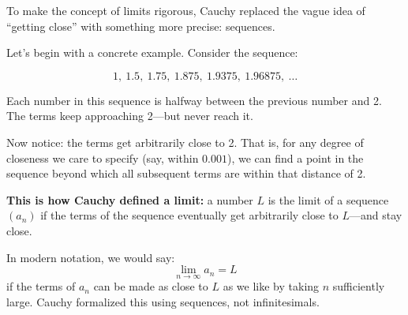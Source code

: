 To make the concept of limits rigorous, Cauchy replaced the vague idea of “getting close” with something more precise: sequences.

Let’s begin with a concrete example. Consider the sequence:

\[
1,\ 1.5,\ 1.75,\ 1.875,\ 1.9375,\ 1.96875,\ \dots
\]

Each number in this sequence is halfway between the previous number and 2. The terms keep approaching 2—but never reach it.

Now notice: the terms get arbitrarily close to 2. That is, for any degree of closeness we care to specify (say, within \(0.001\)), we can find a point in the sequence beyond which all subsequent terms are within that distance of 2.

\textbf{This is how Cauchy defined a limit:} a number \( L \) is the limit of a sequence \( (a_n) \) if the terms of the sequence eventually get arbitrarily close to \( L \)—and stay close.

In modern notation, we would say:  
\[
\lim_{n \to \infty} a_n = L
\]
if the terms of \( a_n \) can be made as close to \( L \) as we like by taking \( n \) sufficiently large. Cauchy formalized this using sequences, not infinitesimals.

\begin{center}
\end{center}

